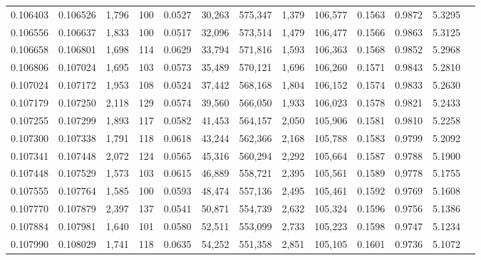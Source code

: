 \begin{tabular}{rrrrrrrrrrrrr}
0.106403 & 0.106526 & 1,796 & 100 &                                     0.0527 &  30,263 & 575,347 &   1,379 & 106,577 & 0.1563 & 0.9872 & 5.3295 \\
0.106556 & 0.106637 & 1,833 & 100 &                                     0.0517 &  32,096 & 573,514 &   1,479 & 106,477 & 0.1566 & 0.9863 & 5.3125 \\
0.106658 & 0.106801 & 1,698 & 114 &                                     0.0629 &  33,794 & 571,816 &   1,593 & 106,363 & 0.1568 & 0.9852 & 5.2968 \\
0.106806 & 0.107024 & 1,695 & 103 &                                     0.0573 &  35,489 & 570,121 &   1,696 & 106,260 & 0.1571 & 0.9843 & 5.2810 \\
0.107024 & 0.107172 & 1,953 & 108 &                                     0.0524 &  37,442 & 568,168 &   1,804 & 106,152 & 0.1574 & 0.9833 & 5.2630 \\
0.107179 & 0.107250 & 2,118 & 129 &                                     0.0574 &  39,560 & 566,050 &   1,933 & 106,023 & 0.1578 & 0.9821 & 5.2433 \\
0.107255 & 0.107299 & 1,893 & 117 &                                     0.0582 &  41,453 & 564,157 &   2,050 & 105,906 & 0.1581 & 0.9810 & 5.2258 \\
0.107300 & 0.107338 & 1,791 & 118 &                                     0.0618 &  43,244 & 562,366 &   2,168 & 105,788 & 0.1583 & 0.9799 & 5.2092 \\
0.107341 & 0.107448 & 2,072 & 124 &                                     0.0565 &  45,316 & 560,294 &   2,292 & 105,664 & 0.1587 & 0.9788 & 5.1900 \\
0.107448 & 0.107529 & 1,573 & 103 &                                     0.0615 &  46,889 & 558,721 &   2,395 & 105,561 & 0.1589 & 0.9778 & 5.1755 \\
0.107555 & 0.107764 & 1,585 & 100 &                                     0.0593 &  48,474 & 557,136 &   2,495 & 105,461 & 0.1592 & 0.9769 & 5.1608 \\
0.107770 & 0.107879 & 2,397 & 137 &                                     0.0541 &  50,871 & 554,739 &   2,632 & 105,324 & 0.1596 & 0.9756 & 5.1386 \\
0.107884 & 0.107981 & 1,640 & 101 &                                     0.0580 &  52,511 & 553,099 &   2,733 & 105,223 & 0.1598 & 0.9747 & 5.1234 \\
0.107990 & 0.108029 & 1,741 & 118 &                                     0.0635 &  54,252 & 551,358 &   2,851 & 105,105 & 0.1601 & 0.9736 & 5.1072 \\

\end{tabular}
